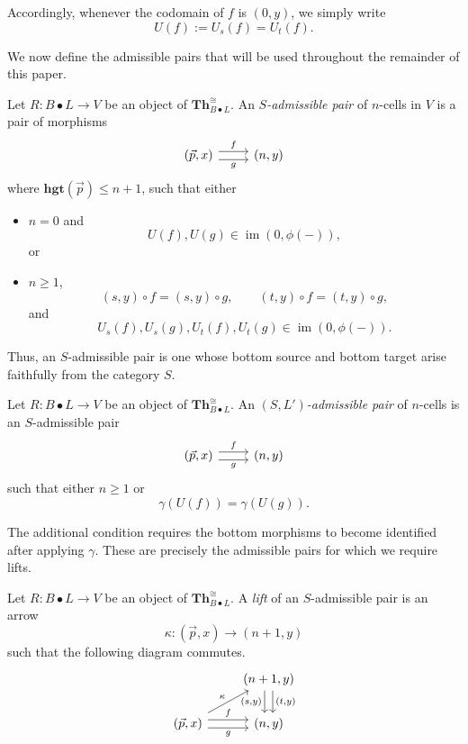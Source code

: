 \documentclass{tac}
\begin{document}
Accordingly, whenever the codomain of $f$ is $(0,y)$, we simply write
\[
U(f):=U_s(f)=U_t(f).
\]

We now define the admissible pairs that will be used throughout the remainder of this paper.

\begin{definition}
Let $R:B\bullet L\to V$ be an object of $\mathbf{Th}_{B\bullet L}^{\cong}$. An \emph{$S$-admissible pair} of $n$-cells in $V$ is a pair of morphisms
\[
\begin{tikzcd}
(\vec{p},x)
\ar[r,shift left=.75ex,"f"]
\ar[r,shift right=.75ex,swap,"g"]
&
(n,y)
\end{tikzcd}
\]
where $\mathbf{hgt}(\vec p)\le n+1$, such that either

\begin{itemize}
\item $n=0$ and
\[
U(f),U(g)\in\operatorname{im}(0,\phi(-)),
\]
or

\item $n\ge1$,
\[
(s,y)\circ f=(s,y)\circ g,
\qquad
(t,y)\circ f=(t,y)\circ g,
\]
and
\[
U_s(f),U_s(g),U_t(f),U_t(g)
\in\operatorname{im}(0,\phi(-)).
\]
\end{itemize}
\end{definition}

Thus, an $S$-admissible pair is one whose bottom source and bottom target arise faithfully from the category $S$.

\begin{definition}\label{gen_admiss_pair}
Let $R:B\bullet L\to V$ be an object of $\mathbf{Th}_{B\bullet L}^{\cong}$. An \emph{$(S,L')$-admissible pair} of $n$-cells is an $S$-admissible pair
\[
\begin{tikzcd}
(\vec{p},x)
\ar[r,shift left=.75ex,"f"]
\ar[r,shift right=.75ex,swap,"g"]
&
(n,y)
\end{tikzcd}
\]
such that either $n\ge1$ or
\[
\gamma(U(f))=\gamma(U(g)).
\]
\end{definition}

The additional condition requires the bottom morphisms to become identified after applying $\gamma$. These are precisely the admissible pairs for which we require lifts.

\begin{definition}
Let $R:B\bullet L\to V$ be an object of $\mathbf{Th}_{B\bullet L}^{\cong}$. A \emph{lift} of an $S$-admissible pair is an arrow
\[
\kappa:(\vec p,x)\to(n+1,y)
\]
such that the following diagram commutes.
\[
\begin{tikzcd}
&
(n+1,y)
\ar[d,shift left=.75ex,"(t{,}y)"]
\ar[d,shift right=.75ex,swap,"(s{,}y)"]
\\
(\vec p,x)
\ar[r,shift left=.75ex,"f"]
\ar[r,shift right=.75ex,swap,"g"]
\ar[ru,"\kappa"]
&
(n,y)
\end{tikzcd}
\]
\end{definition}
\end{document}
